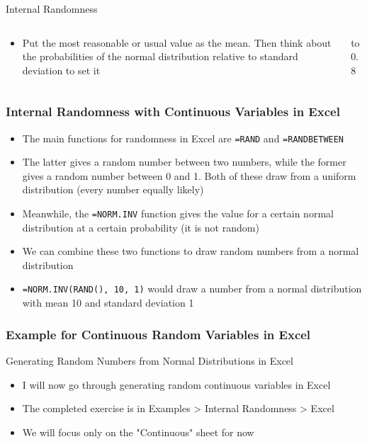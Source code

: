 \documentclass[handout, 11pt]{beamer}
\begin{document}
\begin{section}{Internal Randomness}
\begin{frame}
\begin{columns}
\begin{column}{0.5\textwidth}
{\begin{itemize}
\vfill
\item Put the most reasonable or usual value as the mean. Then think about the probabilities of the normal distribution relative to standard deviation to set it
\end{itemize}}
\end{column}
\begin{column}{0.5\textwidth}
\vbox to 0.8
\end{column}
\end{columns}
\end{frame}
\begin{frame}
\frametitle{Internal Randomness with Continuous Variables in Excel}
\begin{itemize}
\item The main functions for randomness in Excel are
\texttt{=RAND}
and
\texttt{=RANDBETWEEN}
\vfill
\item The latter gives a random number between two numbers, while the former gives a random number between 0 and 1. Both of these draw from a uniform distribution (every number equally likely)
\vfill
\item Meanwhile, the
\texttt{=NORM.INV}
function gives the value for a certain normal distribution at a certain probability (it is not random)
\vfill
\item We can combine these two functions to draw random numbers from a normal distribution
\vfill
\item \texttt{=NORM.INV(RAND(), 10, 1)}
would draw a number from a normal distribution with mean 10 and standard deviation 1
\end{itemize}
\end{frame}
\begin{frame}
\frametitle{Example for Continuous Random Variables in Excel}
{
\begin{block}{Generating Random Numbers from Normal Distributions in Excel}
\begin{itemize}
\item I will now go through generating random continuous variables in Excel
\item The completed exercise is in Examples > Internal Randomness > Excel 
\item We will focus only on the "Continuous" sheet for now
\end{itemize}

\end{block}}
\end{frame}
\end{section}
\end{document}
